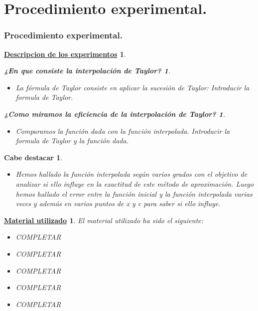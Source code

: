 \documentclass{beamer}
\newtheorem{procedimiento}{Cabe destacar}
\newtheorem{forma}{¿Como miramos la eficiencia de la interpolación de Taylor?}
\newtheorem{idea}{¿En que consiste la interpolación de Taylor?}
\newtheorem{descripcion de los experimentos}{\underline {Descripcion de los experimentos}}
\newtheorem{material}{\underline {Material utilizado}}
\begin{document}
\section{Procedimiento experimental.}
\begin{frame}
\frametitle{Procedimiento experimental.}
\begin {descripcion de los experimentos}
 \tableofcontents[pausesections]
\begin{idea}
\begin {itemize}
\item La fórmula de Taylor consiste en aplicar la sucesión de Taylor:
Introducir la formula de Taylor. 
\end {itemize}
 \tableofcontents[pausesections]
\end {idea}
\begin{forma}
\begin {itemize}
\item Comparamos la función dada con la función interpolada.
Introducir la formula de Taylor y la función dada.
\end {itemize}
\end {forma}
\end{descripcion de los experimentos}
\end{frame}


\begin{frame}
\begin{procedimiento}
 \tableofcontents[pausesections]
\begin {itemize}
\item Hemos hallado la función interpolada según varios grados con el objetivo de analizar si ello influye en la exactitud de este método de aproximación.
Luego hemos hallado el error entre la función inicial y la función interpolada varias veces y además en varios puntos de x y c para saber si ello influye.
\end {itemize}
\end {procedimiento}
\end {frame}


\begin {frame}
\begin{material}
El material utilizado ha sido el siguiente:
 \tableofcontents[pausesections]
\begin {itemize}
\item COMPLETAR
\item COMPLETAR
\item COMPLETAR
\item COMPLETAR
\item COMPLETAR
\end {itemize}
\end {material}
\end{frame}
\end{document}

